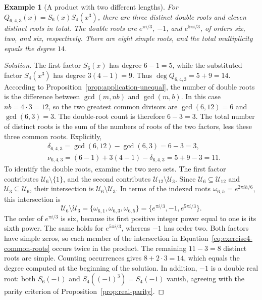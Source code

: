 \documentclass[11pt,a4paper]{article}
\numberwithin{equation}{section}
\theoremstyle{uprightpaper}
\newtheorem{example}{Example}[section]
\begin{document}
\begin{example}[A product with two different lengths]\label{exercise:four}
For $Q_{6,4,3}(x)=S_6(x)S_4(x^3)$, there are three distinct double roots and eleven distinct roots in total. The double roots are $e^{\pi i/3}$, $-1$, and $e^{5\pi i/3}$, of orders six, two, and six, respectively. There are eight simple roots, and the total multiplicity equals the degree $14$.
\end{example}
\begin{proof}[Solution]
The first factor $S_6(x)$ has degree $6-1=5$, while the substituted factor $S_4(x^3)$ has degree $3(4-1)=9$. Thus $\deg Q_{6,4,3}=5+9=14$. According to Proposition~\ref{prop:application-unequal}, the number of double roots is the difference between $\gcd(m, nb)$ and $\gcd(m,b)$. In this case $nb=4\cdot3=12$, so the two greatest common divisors are $\gcd(6,12)=6$ and $\gcd(6,3)=3$. The double-root count is therefore $6-3=3$. The total number of distinct roots is the sum of the numbers of roots of the two factors, less these three common roots. Explicitly,
\begin{subequations}\label{eq:exercise4-counts}
\begin{align}
 &\delta_{6,4,3}=\gcd(6,12)-\gcd(6,3)=6-3=3,\label{eq:exercise4-double}\\
 &\nu_{6,4,3}=(6-1)+3(4-1)-\delta_{6,4,3}=5+9-3=11.\label{eq:exercise4}
\end{align}
\end{subequations}
To identify the double roots, examine the two zero sets. The first factor contributes $\mathcal U_6\setminus\{1\}$, and the second contributes $\mathcal U_{12}\setminus\mathcal U_3$. Since $\mathcal U_6\subseteq\mathcal U_{12}$ and $\mathcal U_3\subseteq\mathcal U_6$, their intersection is $\mathcal U_6\setminus\mathcal U_3$. In terms of the indexed roots $\omega_{6,h}=e^{2\pi i h/6}$, this intersection is
\begin{equation}\label{eq:exercise4-common-roots}
 \mathcal U_6\setminus\mathcal U_3=\{\omega_{6,1},\omega_{6,3},\omega_{6,5}\}=\{e^{\pi i/3},-1,e^{5\pi i/3}\}.
\end{equation}
The order of $e^{\pi i/3}$ is six, because its first positive integer power equal to one is its sixth power. The same holds for $e^{5\pi i/3}$, whereas $-1$ has order two. Both factors have simple zeros, so each member of the intersection in Equation~\eqref{eq:exercise4-common-roots} occurs twice in the product. The remaining $11-3=8$ distinct roots are simple. Counting occurrences gives $8+2\cdot3=14$, which equals the degree computed at the beginning of the solution. In addition, $-1$ is a double real root: both $S_6(-1)$ and $S_4((-1)^3)=S_4(-1)$ vanish, agreeing with the parity criterion of Proposition~\ref{prop:real-parity}.
\end{proof}
\end{document}
